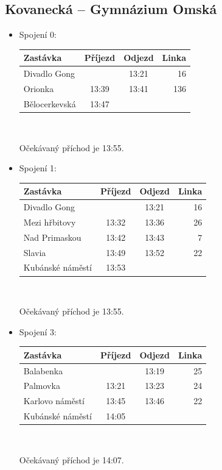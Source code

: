 \subsection{Kovanecká -- Gymnázium Omská}
\begin{itemize}
\item Spojení 0:\\
\vspace*{-0.5cm}
\begin{center}
\begin{tabular}{|l c c r|}\hline
{\bf Zastávka}&{\bf Příjezd}&{\bf Odjezd}&{\bf Linka}\\\hline
Divadlo Gong&&13:21&16\\
Orionka&13:39&13:41&136\\
Bělocerkevská&13:47&&\\\hline
\end{tabular}\\[2mm]
\end{center}
Očekávaný příchod je 13:55.
 
\item Spojení 1:\\
\vspace*{-0.5cm}
\begin{center}
\begin{tabular}{|l c c r|}\hline
{\bf Zastávka}&{\bf Příjezd}&{\bf Odjezd}&{\bf Linka}\\\hline
Divadlo Gong&&13:21&16\\
Mezi hřbitovy&13:32&13:36&26\\
Nad Primaskou&13:42&13:43&7\\
Slavia&13:49&13:52&22\\
Kubánské náměstí&13:53&&\\\hline
\end{tabular}\\[2mm]
\end{center}
Očekávaný příchod je 13:55.
 

\item Spojení 3:\\
\vspace*{-0.5cm}
\begin{center}
\begin{tabular}{|l c c r|}\hline
{\bf Zastávka}&{\bf Příjezd}&{\bf Odjezd}&{\bf Linka}\\\hline
Balabenka&&13:19&25\\
Palmovka&13:21&13:23&24\\
Karlovo náměstí&13:45&13:46&22\\
Kubánské náměstí&14:05&&\\\hline
\end{tabular}\\[2mm]
\end{center}
Očekávaný příchod je 14:07.
 

\end{itemize}
